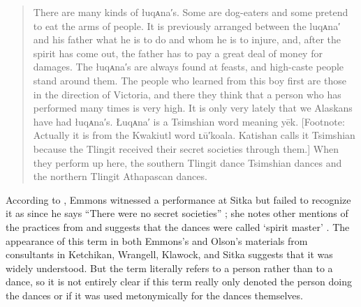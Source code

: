 \begin{quote}\small
There are many kinds of łuqᴀna′s.
Some are dog-eaters and some pretend to eat the arms of people.
It is previously arranged between the luqᴀna′ and his father what he is to do and whom he is to injure, and, after the spirit has come out, the father has to pay a great deal of money for damages.
The łuqᴀna′s are always found at feasts, and high-caste people stand around them.
The people who learned from this boy first are those in the direction of Victoria, and there they think that a person who has performed many times is very high.
It is only very lately that we Alaskans have had łuqᴀna′s.
Łuqᴀna′ is a Tsimshian word meaning yēk. [Footnote: Actually it is from the Kwakiutl word ʟū′koala.
Katishan calls it Tsimshian because the Tlingit received their secret societies through them.] When they perform up here, the southern Tlingit dance Tsimshian dances and the northern Tlingit Athapascan dances.
\end{quote}

According to \citeauthor{de-laguna:1972}, Emmons witnessed a performance at Sitka but failed to recognize it as  since he says “There were no secret societies” \parencite[21]{emmons:1991}; she notes other mentions of the practices from \textcite[98–100, 118–121]{olson:1967} and suggests that the dances were called  ‘spirit master’ \parencite[319]{emmons:1991}.
The appearance of this term in both Emmons’s and Olson’s materials from consultants in Ketchikan, Wrangell, Klawock, and Sitka suggests that it was widely understood.
But the term  literally refers to a person rather than to a dance, so it is not entirely clear if this term really only denoted the person doing the dances or if it was used metonymically for the dances themselves.

